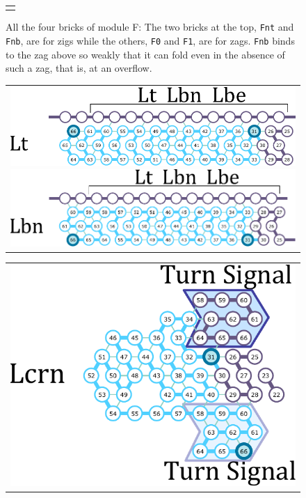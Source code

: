 \documentclass[twocolumn]{svjour3}
\begin{document}
\begin{figure}[tb]
\begin{tabular}{c}
\begin{minipage}{0.5\linewidth}
 \end{minipage}
 \end{tabular}
\caption{All the four bricks of module F: The two bricks at the top, \texttt{Fnt} and \texttt{Fnb}, are for zigs while the others, \texttt{F0} and \texttt{F1}, are for zags. 
\texttt{Fnb} binds to the zag above so weakly that it can fold even in the absence of such a zag, that is, at an overflow.
}
 \label{fig:formatters}
\end{figure}



\begin{figure}[tb]
\begin{tabular}{c}
 \begin{minipage}{0.5\linewidth}
  \centering
   \includegraphics[width=0.9\linewidth]{fig/svg/Lt_3.pdf}
 \end{minipage}
 
 \begin{minipage}{0.5\linewidth}
  \centering
   \includegraphics[width=0.9\linewidth]{fig/svg/Lbc_3.pdf}

 \end{minipage}
 \end{tabular}

\vspace*{3mm}

\begin{tabular}{c}
 \begin{minipage}{0.5\linewidth}
  \centering
   \includegraphics[width=0.8\linewidth]{fig/svg/Ltrc_3.pdf}
 \end{minipage}
 

\end{tabular}
\end{figure}
\end{document}

